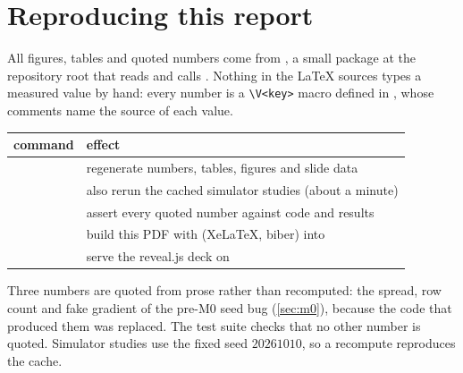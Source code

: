 \section{Reproducing this report}
\label{app:reproduce}

All figures, tables and quoted numbers come from , a small package at the repository
root that reads  and calls . Nothing in the \LaTeX{} sources types a
measured value by hand: every number is a \verb|\V<key>| macro defined in
, whose comments name the source of each value.

\begin{center}
\begin{tabular}{L{6.2cm}L{8.8cm}}
  \toprule
  command & effect \\
  \midrule
   & regenerate numbers, tables, figures and slide data \\
   & also rerun the cached simulator studies (about a minute) \\
   & assert every quoted number against code and results \\
   & build this PDF with  (XeLaTeX, biber) into  \\
   & serve the reveal.js deck on  \\
  \bottomrule
\end{tabular}
\end{center}

Three numbers are quoted from prose rather than recomputed: the spread, row count and fake
gradient of the pre-M0 seed bug (\cref{sec:m0}), because the code that produced them was replaced.
The test suite checks that no other number is quoted. Simulator studies use the fixed seed
$20261010$, so a recompute reproduces the cache.
